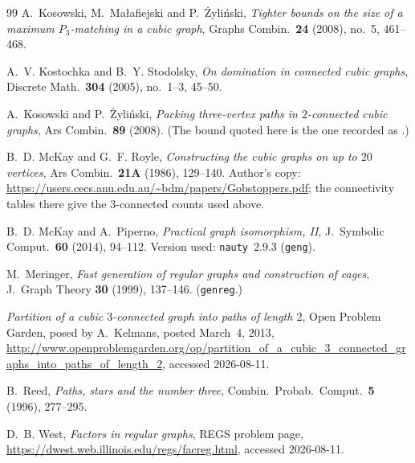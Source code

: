 \documentclass[11pt]{amsart}
\theoremstyle{plain}
\theoremstyle{definition}
\theoremstyle{remark}
\begin{document}
\begin{thebibliography}{99}
A.~Kosowski, M.~Ma\l afiejski and P.~\.Zyli\'nski,
\emph{Tighter bounds on the size of a maximum $P_3$-matching in a cubic
graph},
Graphs Combin.\ \textbf{24} (2008), no.~5, 461--468.

A.~V. Kostochka and B.~Y. Stodolsky,
\emph{On domination in connected cubic graphs},
Discrete Math.\ \textbf{304} (2005), no.~1--3, 45--50.

A.~Kosowski and P.~\.Zyli\'nski,
\emph{Packing three-vertex paths in $2$-connected cubic graphs},
Ars Combin.\ \textbf{89} (2008). (The bound quoted here is the one
recorded as \cite[1.8]{Kel11}.)

B.~D. McKay and G.~F. Royle,
\emph{Constructing the cubic graphs on up to $20$ vertices},
Ars Combin.\ \textbf{21A} (1986), 129--140. Author's copy:
\url{https://users.cecs.anu.edu.au/~bdm/papers/Gobstoppers.pdf}; the
connectivity tables there give the $3$-connected counts used above.

B.~D. McKay and A.~Piperno,
\emph{Practical graph isomorphism, II},
J.\ Symbolic Comput.\ \textbf{60} (2014), 94--112. Version used:
\texttt{nauty}~2.9.3 (\texttt{geng}).

M.~Meringer,
\emph{Fast generation of regular graphs and construction of cages},
J.\ Graph Theory \textbf{30} (1999), 137--146. (\texttt{genreg}.)

\emph{Partition of a cubic $3$-connected graph into paths of length $2$},
Open Problem Garden, posed by A.~Kelmans, posted March~4, 2013,
\url{http://www.openproblemgarden.org/op/partition_of_a_cubic_3_connected_graphs_into_paths_of_length_2},
accessed 2026-08-11.

B.~Reed,
\emph{Paths, stars and the number three},
Combin.\ Probab.\ Comput.\ \textbf{5} (1996), 277--295.

D.~B. West,
\emph{Factors in regular graphs}, REGS problem page,
\url{https://dwest.web.illinois.edu/regs/facreg.html}, accessed
2026-08-11.

\end{thebibliography}
\end{document}
